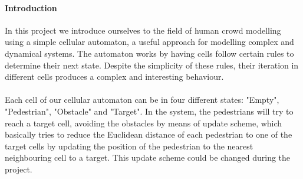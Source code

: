 \documentclass[10pt,a4paper]{article}
\begin{document}
\frontpage

\paragraph{Introduction}
 In this project we introduce ourselves to the field of human crowd modelling using a simple cellular automaton, a useful approach for modelling complex and dynamical systems. The automaton works by having cells follow certain rules to determine their next state. Despite the simplicity of these rules, their iteration in different cells produces a complex and interesting behaviour.

\paragraph{}Each cell of our cellular automaton can be in four different states: "Empty", "Pedestrian", "Obstacle" and "Target". In the system, the pedestrians will try to reach a target cell, avoiding the obstacles by means of update scheme, which basically tries to reduce the Euclidean distance of each pedestrian to one of the target cells by updating the position of the pedestrian to the nearest neighbouring cell to a target. This update scheme could be changed during the project.
\end{document}
